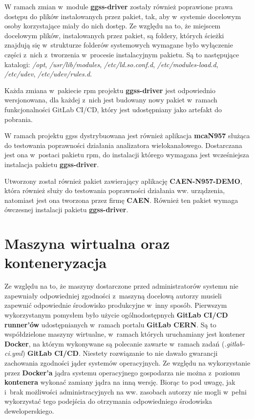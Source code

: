 W ramach zmian w~module \textbf{ggss-driver} zostały również poprawione prawa dostępu do plików instalowanych przez pakiet, tak, aby w~systemie docelowym osoby korzystające miały do nich dostęp. 
Ze względu na to, że miejscem docelowym plików, instalowanych przez pakiet, są foldery, których ścieżki znajdują się w~strukturze folderów systemowych wymagane było wyłączenie części z~nich z~tworzenia w~procesie instalacyjnym pakietu. Są to następujące katalogi: \textit{/opt}, \textit{/usr/lib/modules}, \textit{/etc/ld.so.conf.d}, \textit{/etc/modules-load.d}, \textit{/etc/udev}, \textit{/etc/udev/rules.d}.

Każda zmiana w~pakiecie \gls*{rpm} projektu \textbf{ggss-driver} jest odpowiednio wersjonowana, dla każdej z~nich jest budowany nowy pakiet w~ramach funkcjonalności GitLab CI/CD, który jest udostępniany jako artefakt do pobrania.

W ramach projektu \gls*{ggss} dystrybuowana jest również aplikacja \textbf{mcaN957} służąca do testowania poprawności działania analizatora wielokanałowego. Dostarczana jest ona w~postaci pakietu \gls*{rpm}, do instalacji którego wymagana jest wcześniejsza instalacja pakietu \textbf{ggss-driver}.

Utworzony został również pakiet zawierający aplikację \textbf{CAEN-N957-DEMO}, która również służy do testowania poprawności działania ww. urządzenia, natomiast jest ona tworzona przez firmę \textbf{CAEN}. Również ten pakiet wymaga ówczesnej instalacji pakietu \textbf{ggss-driver}.


\newpage
\section{Maszyna wirtualna oraz konteneryzacja}
\label{sec:wirtDocker}

Ze względu na to, że maszyny dostarczone przed administratorów systemu nie zapewniały odpowiedniej zgodności z~maszyną docelową autorzy musieli zapewnić odpowiednie środowisko produkcyjne w~inny sposób. Pierwszym wykorzystanym pomysłem było użycie ogólnodostępnych \textbf{GitLab CI/CD runner'ów} udostępnianych w~ramach portalu \textbf{GitLab CERN}. Są to współdzielone maszyny wirtualne, w~ramach których uruchamiany jest kontener \textbf{Docker}, na którym wykonywane są polecanie zawarte w~ramach zadań (\textit{.gitlab-ci.yml}) \textbf {GitLab CI/CD}. Niestety rozwiązanie to nie dawało gwarancji zachowania zgodności jąder systemów operacyjnych. Ze względu na wykorzystanie przez \textbf{Docker'a} jądra systemu operacyjnego gospodarza nie można z~poziomu \textbf{kontenera} wykonać zamiany jądra na inną wersję. Biorąc to pod uwagę, jak i~brak możliwości administracyjnych na ww. zasobach autorzy nie mogli w~pełni wykorzystać tego podejścia do otrzymania odpowiedniego środowiska deweloperskiego.

